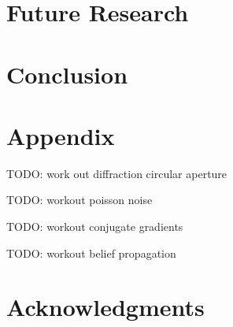 \documentclass[journal]{IEEEtran}
\begin{document}
    \section{Future Research}\label{sec:future-research}
    \section{Conclusion}\label{sec:conclusion}
    \section{Appendix}\label{sec:appendix}
    TODO: work out diffraction circular aperture

    TODO: workout poisson noise

    TODO: workout conjugate gradients

    TODO: workout belief propagation

    \section*{Acknowledgments}
    \newpage
    \printbibliography
\end{document}
